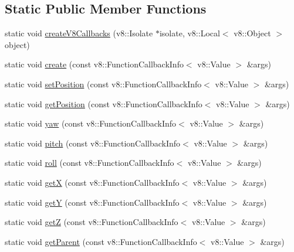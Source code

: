 \subsection*{Static Public Member Functions}
\begin{DoxyCompactItemize}
\item 
static void \mbox{\hyperlink{class_rad_j_a_v_1_1_c3_d_1_1_entity_a53a03d847e306b8162bdd22f056585c4}{create\+V8\+Callbacks}} (v8\+::\+Isolate $\ast$isolate, v8\+::\+Local$<$ v8\+::\+Object $>$ object)
\item 
static void \mbox{\hyperlink{class_rad_j_a_v_1_1_c3_d_1_1_entity_a347f17e461f890125265f869cac0c145}{create}} (const v8\+::\+Function\+Callback\+Info$<$ v8\+::\+Value $>$ \&args)
\item 
static void \mbox{\hyperlink{class_rad_j_a_v_1_1_c3_d_1_1_entity_a200b890f19d75c778af0a95a028cd986}{set\+Position}} (const v8\+::\+Function\+Callback\+Info$<$ v8\+::\+Value $>$ \&args)
\item 
static void \mbox{\hyperlink{class_rad_j_a_v_1_1_c3_d_1_1_entity_af88ebda2dec948ea7227b7c3536a6d18}{get\+Position}} (const v8\+::\+Function\+Callback\+Info$<$ v8\+::\+Value $>$ \&args)
\item 
static void \mbox{\hyperlink{class_rad_j_a_v_1_1_c3_d_1_1_entity_a4db7b6949ae3102930a9c204835f5124}{yaw}} (const v8\+::\+Function\+Callback\+Info$<$ v8\+::\+Value $>$ \&args)
\item 
static void \mbox{\hyperlink{class_rad_j_a_v_1_1_c3_d_1_1_entity_add1547ae2b269081e02870d5c1ebd936}{pitch}} (const v8\+::\+Function\+Callback\+Info$<$ v8\+::\+Value $>$ \&args)
\item 
static void \mbox{\hyperlink{class_rad_j_a_v_1_1_c3_d_1_1_entity_afdaa23d4494eeaa821ac8177e2151210}{roll}} (const v8\+::\+Function\+Callback\+Info$<$ v8\+::\+Value $>$ \&args)
\item 
static void \mbox{\hyperlink{class_rad_j_a_v_1_1_c3_d_1_1_entity_a7b9629ae0eb2f4162c1c67ecd337610a}{getX}} (const v8\+::\+Function\+Callback\+Info$<$ v8\+::\+Value $>$ \&args)
\item 
static void \mbox{\hyperlink{class_rad_j_a_v_1_1_c3_d_1_1_entity_a2bc56ea331fa880695d63fa36232277e}{getY}} (const v8\+::\+Function\+Callback\+Info$<$ v8\+::\+Value $>$ \&args)
\item 
static void \mbox{\hyperlink{class_rad_j_a_v_1_1_c3_d_1_1_entity_aeec09a7006436f4fe55b97bdc8b9fe52}{getZ}} (const v8\+::\+Function\+Callback\+Info$<$ v8\+::\+Value $>$ \&args)
\item 
static void \mbox{\hyperlink{class_rad_j_a_v_1_1_c3_d_1_1_entity_a23869d3a90214cde99fce76757a6ef55}{get\+Parent}} (const v8\+::\+Function\+Callback\+Info$<$ v8\+::\+Value $>$ \&args)

\end{DoxyCompactItemize}
